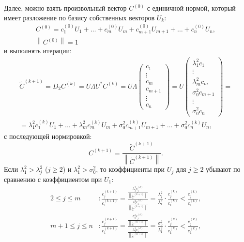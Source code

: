 \documentclass[a4paper,12pt]{article}
\newcommand{\norm}[1]{\left \| #1 \right \|}
\begin{document}
    Далее, можно взять произвольный вектор $C^{(0)}$ с единичной нормой, который имеет разложение по базису собственных векторов $U_k$:
    \begin{gather*}
        C^{(0)} = c_1^{(0)} U_1 + \dots + c_m^{(0)} U_m + c_{m+1}^{(0)} U_{m+1} + \dots + c_n^{(0)} U_n, \\
        \norm{C^{(0)}} = 1
    \end{gather*}
    и выполнять итерации:
    \begin{multline*}
        \widetilde{C}^{(k+1)}
        = D_2 C^{(k)}
        = U \Lambda U^* C^{(k)}
        = U \Lambda
        \begin{pmatrix}
            c_1     \\
            \vdots  \\
            c_m     \\
            c_{m+1} \\
            \vdots  \\
            c_n
        \end{pmatrix}
        = U
        \begin{pmatrix}
            \lambda_1^2 c_1    \\
            \vdots             \\
            \lambda_m^2 c_m    \\
            \sigma_0^2 c_{m+1} \\
            \vdots             \\
            \sigma_0^2 c_n
        \end{pmatrix} = \\
        = \lambda_1^2 c_1^{(k)} U_1 + \dots + \lambda_m^2 c_m^{(k)} U_m + \sigma_0^2 c_{m+1}^{(k)} U_{m+1} + \dots + \sigma_0^2 c_n^{(k)} U_n ,
    \end{multline*}
    с последующей нормировкой:
    \[
        C^{(k+1)} = \frac{\widetilde{C}^{(k+1)}}{\norm{\widetilde{C}^{(k+1)}}}.
    \]
    Если $\lambda_1^2 > \lambda_j^2$ ($j \ge 2$) и $\lambda_1^2 > \sigma_0^2$, то коэффициенты при $U_j$ для $j \ge 2$ убывают по сравнению с коэффициентом при $U_1$:
    \begin{align*}
        2 \le j \le m &:
        \frac{c_j^{(k+1)}}{c_1^{(k+1)}}
        = \frac{\frac{\lambda_j^2 c_j^{(k)}}{\norm{\widetilde{C}^{(k+1)}}}}{\frac{\lambda_1^2 c_1^{(k)}}{\norm{\widetilde{C}^{(k+1)}}}}
        = \frac{\lambda_j^2}{\lambda_1^2} \cdot \frac{c_j^{(k)}}{c_1^{(k)}}
        < \frac{c_j^{(k)}}{c_1^{(k)}} , \\
        m+1 \le j \le n &:
        \frac{c_j^{(k+1)}}{c_1^{(k+1)}}
        = \frac{\frac{\sigma_0^2 c_j^{(k)}}{\norm{\widetilde{C}^{(k+1)}}}}{\frac{\lambda_1^2 c_1^{(k)}}{\norm{\widetilde{C}^{(k+1)}}}}
        = \frac{\sigma_0^2}{\lambda_1^2} \cdot \frac{c_j^{(k)}}{c_1^{(k)}}
        < \frac{c_j^{(k)}}{c_1^{(k)}} , \\
    \end{align*}
\end{document}
